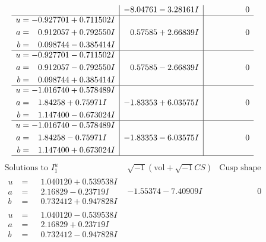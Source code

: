 \documentclass[1p]{elsarticle_modified}
\theoremstyle{definition}
\newcommand{\I}{\sqrt{-1}}
\begin{document}
$$\begin{array}{c|c|c}
 & -8.04761 - 3.28161 I & \phantom{-0.000000 } 0 \\ \hline\begin{aligned}
u &= -0.927701 + 0.711502 I \\
a &= \phantom{-}0.912057 + 0.792550 I \\
b &= \phantom{-}0.098744 - 0.385414 I\end{aligned}
 & \phantom{-}0.57585 + 2.66839 I & \phantom{-0.000000 } 0 \\ \hline\begin{aligned}
u &= -0.927701 - 0.711502 I \\
a &= \phantom{-}0.912057 - 0.792550 I \\
b &= \phantom{-}0.098744 + 0.385414 I\end{aligned}
 & \phantom{-}0.57585 - 2.66839 I & \phantom{-0.000000 } 0 \\ \hline\begin{aligned}
u &= -1.016740 + 0.578489 I \\
a &= \phantom{-}1.84258 + 0.75971 I \\
b &= \phantom{-}1.147400 - 0.673024 I\end{aligned}
 & -1.83353 + 6.03575 I & \phantom{-0.000000 } 0 \\ \hline\begin{aligned}
u &= -1.016740 - 0.578489 I \\
a &= \phantom{-}1.84258 - 0.75971 I \\
b &= \phantom{-}1.147400 + 0.673024 I\end{aligned}
 & -1.83353 - 6.03575 I & \phantom{-0.000000 } 0\\
 \hline 
 \end{array}$$\newpage$$\begin{array}{c|c|c}  
\text{Solutions to }I^u_{1}& \I (\text{vol} + \sqrt{-1}CS) & \text{Cusp shape}\\
 \hline 
\begin{aligned}
u &= \phantom{-}1.040120 + 0.539538 I \\
a &= \phantom{-}2.16829 - 0.23719 I \\
b &= \phantom{-}0.732412 + 0.947828 I\end{aligned}
 & -1.55374 - 7.40909 I & \phantom{-0.000000 } 0 \\ \hline\begin{aligned}
u &= \phantom{-}1.040120 - 0.539538 I \\
a &= \phantom{-}2.16829 + 0.23719 I \\
b &= \phantom{-}0.732412 - 0.947828 I\end{aligned}

\end{array}$$
\end{document}
